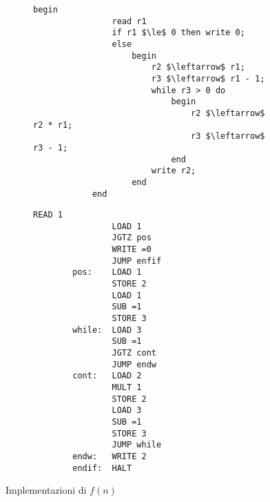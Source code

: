 \documentclass{subfiles}
\begin{document}
\begin{figure}[!h]
    \begin{subfigure}[b]{0.45\textwidth}
        \begin{lstlisting}[language = algol]
            begin
                read r1
                if r1 $\le$ 0 then write 0;
                else
                    begin
                        r2 $\leftarrow$ r1;
                        r3 $\leftarrow$ r1 - 1;
                        while r3 > 0 do
                            begin
                                r2 $\leftarrow$ r2 * r1;
                                r3 $\leftarrow$ r3 - 1;
                            end
                        write r2;
                    end
            end
        \end{lstlisting}
    \end{subfigure}
    \hspace{12pt}
    \begin{subfigure}[b]{0.45\textwidth}
        \begin{lstlisting}[language = RAM]
                READ 1
                LOAD 1
                JGTZ pos
                WRITE =0
                JUMP enfif
        pos:    LOAD 1
                STORE 2
                LOAD 1
                SUB =1
                STORE 3
        while:  LOAD 3
                SUB =1
                JGTZ cont
                JUMP endw
        cont:   LOAD 2
                MULT 1
                STORE 2
                LOAD 3
                SUB =1
                STORE 3
                JUMP while
        endw:   WRITE 2
        endif:  HALT     
    \end{lstlisting}
    \end{subfigure}
    \caption{Implementazioni di \(f(n)\)}
    \label{Fig:2.2}
\end{figure}
\end{document}
